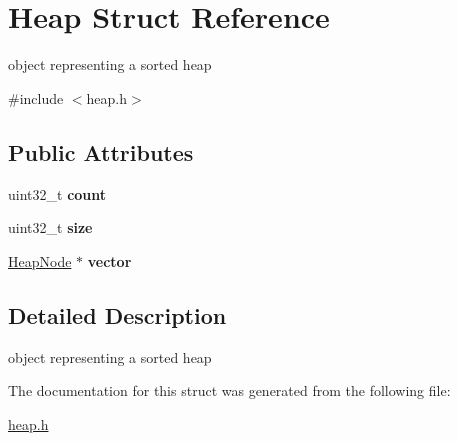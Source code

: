 \hypertarget{structHeap}{}\section{Heap Struct Reference}
\label{structHeap}


object representing a sorted heap  




{\ttfamily \#include $<$heap.\+h$>$}

\subsection*{Public Attributes}
\begin{DoxyCompactItemize}
\item 
\mbox{\label{structHeap_a3b3106ed581d5f644773cda8d0105b55}} 
uint32\+\_\+t {\bfseries count}
\item 
\mbox{\label{structHeap_a91ce44f5eeb884ba4a93aeac175067bf}} 
uint32\+\_\+t {\bfseries size}
\item 
\mbox{\label{structHeap_a877c23ecaaf421986dd338450c4c1e9a}} 
\mbox{\hyperlink{structHeapNode}{Heap\+Node}} $\ast$ {\bfseries vector}
\end{DoxyCompactItemize}


\subsection{Detailed Description}
object representing a sorted heap 

The documentation for this struct was generated from the following file\+:\begin{DoxyCompactItemize}
\item 
\mbox{\hyperlink{heap_8h}{heap.\+h}}\end{DoxyCompactItemize}
